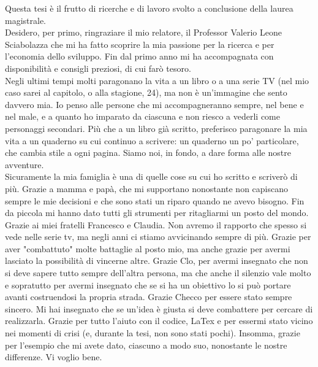 \begin{acknowledgments}
Questa tesi è il frutto di ricerche e di lavoro svolto a conclusione della laurea magistrale.\\
Desidero, per primo, ringraziare il mio relatore, il Professor Valerio Leone Sciabolazza che mi ha fatto scoprire la mia passione per la ricerca e per l’economia dello sviluppo. Fin dal primo anno mi ha accompagnata con disponibilità e consigli preziosi, di cui farò tesoro.\\

Negli ultimi tempi molti paragonano la vita a un libro o a una serie TV (nel mio caso sarei al capitolo, o alla stagione, 24), ma non è un’immagine che sento davvero mia. Io penso alle persone che mi accompagneranno sempre, nel bene e nel male, e a quanto ho imparato da ciascuna e non riesco a vederli come personaggi secondari. Più che a un libro già scritto, preferisco paragonare la mia vita a un quaderno su cui continuo a scrivere: un quaderno un po’ particolare, che cambia stile a ogni pagina. Siamo noi, in fondo, a dare forma alle nostre avventure. \\
Sicuramente la mia famiglia è una di quelle cose su cui ho scritto e scriverò di più. Grazie a mamma e papà, che mi supportano nonostante non capiscano sempre le mie decisioni e che sono stati un riparo quando ne avevo bisogno. Fin da piccola mi hanno dato tutti gli strumenti per ritagliarmi un posto del mondo. \\
Grazie ai miei fratelli Francesco e Claudia. Non avremo il rapporto che spesso si vede nelle serie tv, ma negli anni ci stiamo avvicinando sempre di più. Grazie per aver "combattuto" molte battaglie al posto mio, ma anche grazie per avermi lasciato la possibilità di vincerne altre. Grazie Clo, per avermi insegnato che non si deve sapere tutto sempre dell'altra persona, ma che anche il silenzio vale molto e sopratutto per avermi insegnato che se si ha un obiettivo lo si può portare avanti costruendosi la propria strada. Grazie Checco per essere stato sempre sincero. Mi hai insegnato che se un'idea è giusta si deve combattere per cercare di realizzarla. Grazie per tutto l'aiuto con il codice, LaTex e per essermi stato vicino nei momenti di crisi (e, durante la tesi, non sono stati pochi). Insomma, grazie per l’esempio che mi avete dato, ciascuno a modo suo, nonostante le nostre differenze. Vi voglio bene. \\


\end{acknowledgments}
